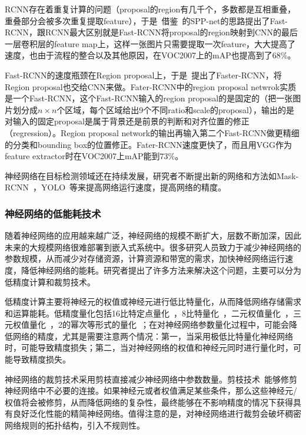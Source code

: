 RCNN存在着重复计算的问题（proposal的region有几千个，多数都是互相重叠，重叠部分会被多次重复提取feature），于是~\citet{girshick2015fast}借鉴~\citet{he2014spatial}的SPP-net的思路提出了Fast-RCNN，跟RCNN最大区别就是Fast-RCNN将proposal的region映射到CNN的最后一层卷积层的feature map上，这样一张图片只需要提取一次feature，大大提高了速度，也由于流程的整合以及其他原因，在VOC2007上的mAP也提高到了$68\%$。

Fast-RCNN的速度瓶颈在Region proposal上，于是~\citet{ren2015faster}提出了Faster-RCNN，将Region proposal也交给CNN来做。Fater-RCNN中的region proposal netwrok实质是一个Fast-RCNN，这个Fast-RCNN输入的region proposal的是固定的（把一张图片划分成$n\times n$个区域，每个区域给出9个不同ratio和scale的proposal），输出的是对输入的固定proposal是属于背景还是前景的判断和对齐位置的修正（regression）。Region proposal network的输出再输入第二个Fast-RCNN做更精细的分类和bounding box的位置修正。Fater-RCNN速度更快了，而且用VGG作为feature extractor时在VOC2007上mAP能到$73\%$。

神经网络在目标检测领域还在持续发展，研究者不断提出新的网络和方法如Mask-RCNN~\cite{he2017mask}，YOLO~\cite{redmon2016you}等来提高网络运行速度，提高网络的精度。


\subsubsection{神经网络的低能耗技术}
随着神经网络的应用越来越广泛，神经网络的规模不断扩大，层数不断加深，因此未来的大规模网络很难部署到嵌入式系统中。很多研究人员致力于减少神经网络的参数规模，从而减少对存储资源，计算资源和带宽的需求，加快神经网络运行速度，降低神经网络的能耗。研究者提出了许多方法来解决这个问题，主要可以分为低精度计算和裁剪技术。

低精度计算主要将神经元的权值或神经元进行低比特量化，从而降低网络存储需求和运算能耗。低精度量化包括16比特定点量化~\cite{gupta2015deep}，8比特量化~\cite{dettmers20158}，二元权值量化~\cite{courbariaux2015binaryconnect}，三元权值量化~\cite{rastegari2016xnor}，2的幂次等形式的量化~\cite{zhou2017incremental}；在对神经网络参数量化过程中，可能会降低网络的精度，尤其是需要注意两个情况：第一，当采用极低比特量化神经网络时，可能导致精度损失；第二，当对神经网络的权值和神经元同时进行量化时，可能导致精度损失。

神经网络的裁剪技术采用剪枝直接减少神经网络中参数数量。剪枝技术~\cite{reed1993pruning, lecun1989optimal, miche2010op, han2015learning, guo2016dynamic}能够修剪神经网络中不必要的连接。如果神经元或者权值满足某些条件，那么这些神经元/权值将会被修剪，从而降低网络的复杂性，最终能够在不影响精度的情况下获得具有良好泛化性能的精简神经网络。值得注意的是，对神经网络进行裁剪会破坏稠密网络规则的拓扑结构，引入不规则性。

